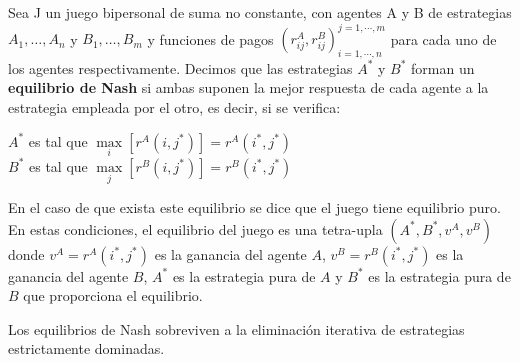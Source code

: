 \begin{definicion}
Sea J un juego bipersonal de suma no constante, con agentes A y B de estrategias $A_1,\ldots,A_n$ y $B_1,\ldots,B_m$ y funciones de pagos $\left( r_{ij}^A,r_{ij}^B \right)_{i=1, \cdots ,n}^{j=1, \cdots, m} $ para cada uno de los agentes respectivamente. Decimos que las estrategias $A^*$ y $B^*$ forman un \textbf{equilibrio de Nash} si ambas suponen la mejor respuesta de cada agente a la estrategia empleada por el otro, es decir, si se verifica:
\begin{center}
    $A^*$ es tal que $\underset{i}{\max} [r^A(i,j^*)] = r^A(i^*,j^*)$\\
    $B^*$ es tal que $\underset{j}{\max} [r^B(i,j^*)] = r^B(i^*,j^*)$\\
\end{center}
\end{definicion}
En el caso de que exista este equilibrio se dice  que el juego tiene equilibrio puro.
En estas condiciones, el equilibrio del juego es una tetra-upla $(A^*,B^*,v^A,v^B)$ donde $v^A=r^A(i^*,j^*)$ es la ganancia del agente $A$, $v^B=r^B(i^*,j^*)$ es la ganancia del agente $B$, $A^*$ es la estrategia pura de $A$ y $B^*$ es la estrategia pura de $B$ que proporciona el equilibrio.\\

\begin{proposicion}
Los equilibrios de Nash sobreviven a la eliminación iterativa de estrategias estrictamente dominadas.
\end{proposicion}

